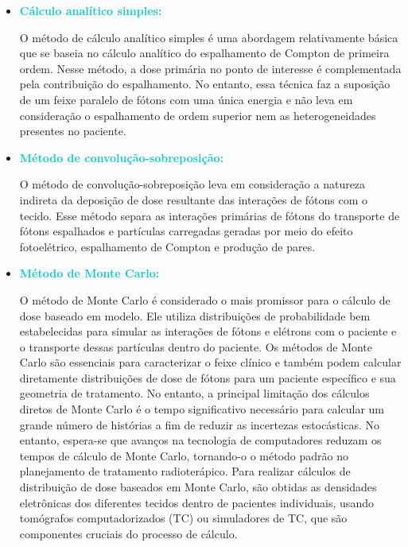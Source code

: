 \documentclass[11pt,a4paper]{article}
\begin{document}
	\begin{itemize}
		\item \textcolor{DarkTurquoise}{\textbf{Cálculo analítico simples:}}
		
		O método de cálculo analítico simples é uma abordagem relativamente básica que se baseia no cálculo analítico do espalhamento de Compton de primeira ordem. Nesse método, a dose primária no ponto de interesse é complementada pela contribuição do espalhamento. No entanto, essa técnica faz a suposição de um feixe paralelo de fótons com uma única energia e não leva em consideração o espalhamento de ordem superior nem as heterogeneidades presentes no paciente.
		 
		\item \textcolor{DarkTurquoise}{\textbf{Método de convolução-sobreposição:}} 
		
		O método de convolução-sobreposição leva em consideração a natureza indireta da deposição de dose resultante das interações de fótons com o tecido. Esse método separa as interações primárias de fótons do transporte de fótons espalhados e partículas carregadas geradas por meio do efeito fotoelétrico, espalhamento de Compton e produção de pares.


		\item \textcolor{DarkTurquoise}{\textbf{Método de Monte Carlo:}}
		
		O método de Monte Carlo é considerado o mais promissor para o cálculo de dose baseado em modelo. Ele utiliza distribuições de probabilidade bem estabelecidas para simular as interações de fótons e elétrons com o paciente e o transporte dessas partículas dentro do paciente. Os métodos de Monte Carlo são essenciais para caracterizar o feixe clínico e também podem calcular diretamente distribuições de dose de fótons para um paciente específico e sua geometria de tratamento. No entanto, a principal limitação dos cálculos diretos de Monte Carlo é o tempo significativo necessário para calcular um grande número de histórias a fim de reduzir as incertezas estocásticas. No entanto, espera-se que avanços na tecnologia de computadores reduzam os tempos de cálculo de Monte Carlo, tornando-o o método padrão no planejamento de tratamento radioterápico. Para realizar cálculos de distribuição de dose baseados em Monte Carlo, são obtidas as densidades eletrônicas dos diferentes tecidos dentro de pacientes individuais, usando tomógrafos computadorizados (TC) ou simuladores de TC, que são componentes cruciais do processo de cálculo.
	\end{itemize}
\end{document}
